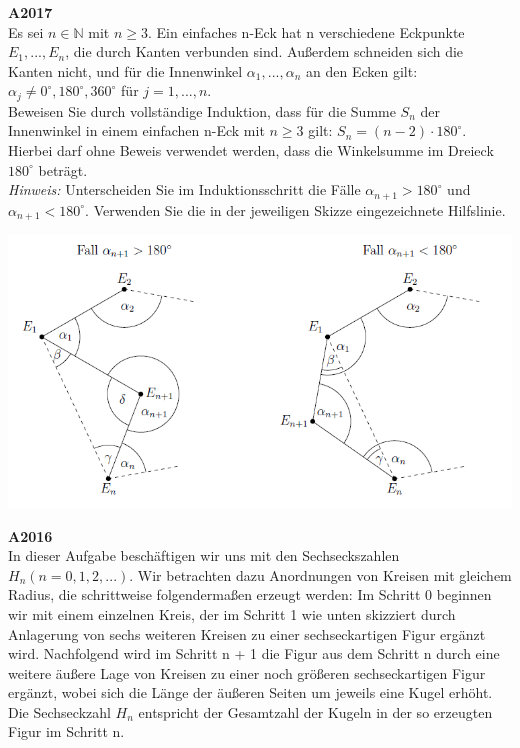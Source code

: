 \documentclass[landscape,twocolumn,a4paper]{article}
\begin{document}
\newpage

\textbf{A2017} \\
Es sei $n \in \mathbb{N}$ mit $n \ge 3$. Ein einfaches n-Eck hat n verschiedene Eckpunkte $E_1,...,E_n$, die
durch Kanten verbunden sind. Außerdem schneiden sich die Kanten nicht, und für die Innenwinkel 
$\alpha_1,...,\alpha_n$ an den Ecken gilt: $\alpha_j \neq 0^\circ, 180^\circ, 360^\circ$ für $j=1,...,n$. \\
Beweisen Sie durch vollständige Induktion, dass für die Summe $S_n$ der Innenwinkel in einem einfachen
n-Eck mit $n \ge 3$ gilt: $S_n = (n-2) \cdot 180^\circ$. Hierbei darf ohne Beweis verwendet werden,
dass die Winkelsumme im Dreieck $180^\circ$ beträgt. \\
\textit{Hinweis:} Unterscheiden Sie im Induktionsschritt die Fälle $\alpha_{n+1} > 180^\circ$ und
$\alpha_{n+1} < 180^\circ$. Verwenden Sie die in der jeweiligen Skizze eingezeichnete Hilfslinie.

\includegraphics[scale=0.8]{bild2.png} \\
\bigskip

\newpage
\textbf{A2016} \\
In dieser Aufgabe beschäftigen wir uns mit den Sechseckszahlen $H_n (n=0,1,2,...)$. Wir betrachten
dazu Anordnungen von Kreisen mit gleichem Radius, die schrittweise folgendermaßen erzeugt werden:
Im Schritt 0 beginnen wir mit einem einzelnen Kreis, der im Schritt 1 wie unten skizziert durch
Anlagerung von sechs weiteren Kreisen zu einer sechseckartigen Figur ergänzt wird. Nachfolgend
wird im Schritt n + 1 die Figur aus dem Schritt n durch eine weitere äußere Lage von Kreisen zu
einer noch größeren sechseckartigen Figur ergänzt, wobei sich die Länge der äußeren Seiten um jeweils
eine Kugel erhöht. Die Sechseckzahl $H_n$ entspricht der Gesamtzahl der Kugeln in der so erzeugten
Figur im Schritt n. \\
\end{document}
